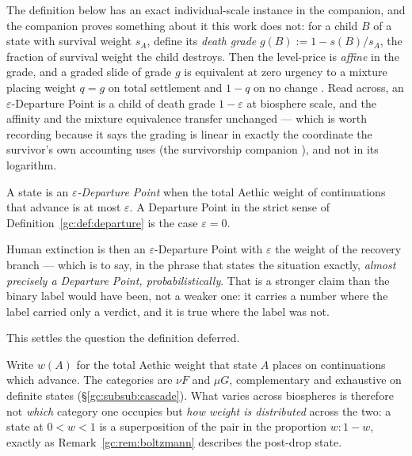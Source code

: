 \begin{remark}
\begin{remark}\label{gc:rem:deathgrade}
The definition below has an exact individual-scale instance in the
companion, and the companion proves something about it this work does
not: for a child $B$ of a state with survival weight $s_A$, define its
\emph{death grade} $g(B):=1-s(B)/s_A$, the fraction of survival weight
the child destroys. Then the level-price is \emph{affine} in the grade,
and a graded slide of grade $g$ is equivalent at zero urgency to a
mixture placing weight $q=g$ on total settlement and $1-q$ on no change
\cite{Aethus}. Read across, an $\varepsilon$-Departure Point is a child of
death grade $1-\varepsilon$ at biosphere scale, and the affinity and the
mixture equivalence transfer unchanged --- which is worth recording
because it says the grading is linear in exactly the coordinate the
survivor's own accounting uses (the survivorship companion \cite{GoldenSurvivorship}), and
not in its logarithm.
\end{remark}

\begin{definition}\label{gc:def:epsdep}
A state is an \emph{$\varepsilon$-Departure Point} when the total
Aethic weight of continuations that advance is at most $\varepsilon$. A
Departure Point in the strict sense of
Definition~\ref{gc:def:departure} is the case $\varepsilon=0$.
\end{definition}

Human extinction is then an $\varepsilon$-Departure Point with
$\varepsilon$ the weight of the recovery branch --- which is to say,
in the phrase that states the situation exactly, \emph{almost precisely
a Departure Point, probabilistically}. That is a stronger claim than
the binary label would have been, not a weaker one: it carries a
number where the label carried only a verdict, and it is true where the
label was not.

This settles the question the definition deferred.

\begin{remark}\label{gc:rem:pairsuffices}
Write $w(A)$ for the total Aethic weight that state $A$ places on
continuations which advance. The categories are $\nu F$ and $\mu G$,
complementary and exhaustive on definite states
(\S\ref{gc:subsub:cascade}). What varies across biospheres is therefore
not \emph{which} category one occupies but \emph{how weight is
distributed} across the two: a state at $0<w<1$ is a superposition of
the pair in the proportion $w:1-w$, exactly as
Remark~\ref{gc:rem:boltzmann} describes the post-drop state.


\end{remark}
\end{remark}
